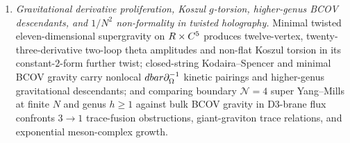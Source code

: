 \begin{enumerate}[label=(\arabic*),leftmargin=*]
  \item \emph{Gravitational derivative proliferation, Koszul $g$-torsion, higher-genus BCOV descendants, and $1/N^2$ non-formality in twisted holography.} Minimal twisted eleven-dimensional supergravity on $R \times C^5$ produces twelve-vertex, twenty-three-derivative two-loop theta amplitudes and non-flat Koszul torsion in its constant-$2$-form further twist; closed-string Kodaira--Spencer and minimal BCOV gravity carry nonlocal $dbar\partial_\Omega^{-1}$ kinetic pairings and higher-genus gravitational descendants; and comparing boundary $\mathcal{N}=4$ super Yang--Mills at finite $N$ and genus $h \ge 1$ against bulk BCOV gravity in $\mathrm{D}3$-brane flux confronts $3 \to 1$ trace-fusion obstructions, giant-graviton trace relations, and exponential meson-complex growth.
\end{enumerate}

